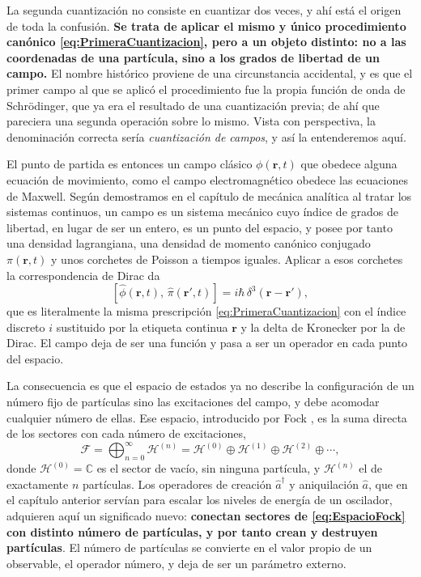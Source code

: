         La segunda cuantización no consiste en cuantizar dos veces, y ahí está el origen de toda la confusión. \textbf{Se trata de aplicar el mismo y único procedimiento canónico \eqref{eq:PrimeraCuantizacion}, pero a un objeto distinto: no a las coordenadas de una partícula, sino a los grados de libertad de un campo.} El nombre histórico proviene de una circunstancia accidental, y es que el primer campo al que se aplicó el procedimiento fue la propia función de onda de Schrödinger, que ya era el resultado de una cuantización previa; de ahí que pareciera una segunda operación sobre lo mismo. Vista con perspectiva, la denominación correcta sería \textit{cuantización de campos}, y así la entenderemos aquí.

        El punto de partida es entonces un campo clásico $\phi(\mathbf{r},t)$ que obedece alguna ecuación de movimiento, como el campo electromagnético obedece las ecuaciones de Maxwell. Según demostramos en el capítulo de mecánica analítica al tratar los sistemas continuos, un campo es un sistema mecánico cuyo índice de grados de libertad, en lugar de ser un entero, es un punto del espacio, y posee por tanto una densidad lagrangiana, una densidad de momento canónico conjugado $\pi(\mathbf{r},t)$ y unos corchetes de Poisson a tiempos iguales. Aplicar a esos corchetes la correspondencia de Dirac da
        \begin{equation}\label{eq:SegundaCuantizacion}
            \left[\hat{\phi}(\mathbf{r},t),\,\hat{\pi}(\mathbf{r}',t)\right] = i\hbar\,\delta^{3}\!\left(\mathbf{r}-\mathbf{r}'\right),
        \end{equation}
        que es literalmente la misma prescripción \eqref{eq:PrimeraCuantizacion} con el índice discreto $i$ sustituido por la etiqueta continua $\mathbf{r}$ y la delta de Kronecker por la de Dirac. El campo deja de ser una función y pasa a ser un operador en cada punto del espacio.

        La consecuencia es que el espacio de estados ya no describe la configuración de un número fijo de partículas sino las excitaciones del campo, y debe acomodar cualquier número de ellas. Ese espacio, introducido por Fock \cite{Fock1932}, es la suma directa de los sectores con cada número de excitaciones,
        \begin{equation}\label{eq:EspacioFock}
            \mathcal{F} = \bigoplus_{n=0}^{\infty} \mathcal{H}^{(n)} = \mathcal{H}^{(0)} \oplus \mathcal{H}^{(1)} \oplus \mathcal{H}^{(2)} \oplus \cdots,
        \end{equation}
        donde $\mathcal{H}^{(0)} = \mathbb{C}$ es el sector de vacío, sin ninguna partícula, y $\mathcal{H}^{(n)}$ el de exactamente $n$ partículas. Los operadores de creación $\hat{a}^{\dagger}$ y aniquilación $\hat{a}$, que en el capítulo anterior servían para escalar los niveles de energía de un oscilador, adquieren aquí un significado nuevo: \textbf{conectan sectores de \eqref{eq:EspacioFock} con distinto número de partículas, y por tanto crean y destruyen partículas}. El número de partículas se convierte en el valor propio de un observable, el operador número, y deja de ser un parámetro externo.

